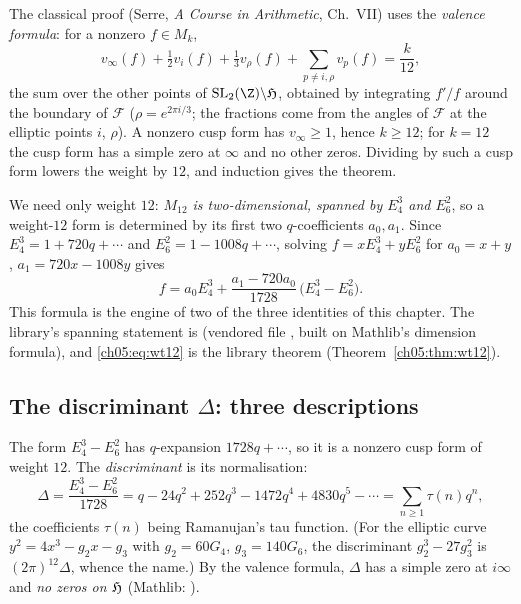The classical proof (Serre, \emph{A Course in Arithmetic}, Ch.~VII) uses the \emph{valence
formula}: for a nonzero $f\in M_k$,
\begin{equation*}
  v_\infty(f) + \tfrac12 v_i(f) + \tfrac13 v_\rho(f) + \sum_{p\neq i,\rho} v_p(f) = \frac{k}{12},
\end{equation*}
the sum over the other points of $\chfiveSL\backslash\chfiveH$, obtained by integrating $f'/f$ around
the boundary of $\mathcal F$ ($\rho = e^{2\pi i/3}$; the fractions come from the angles of $\mathcal F$
at the elliptic points $i$, $\rho$). A nonzero cusp form has $v_\infty\ge1$, hence $k\ge 12$; for
$k = 12$ the cusp form has a simple zero at $\infty$ and no other zeros. Dividing by such a cusp
form lowers the weight by $12$, and induction gives the theorem.

We need only weight $12$: \emph{$M_{12}$ is two-dimensional, spanned by $E_4^3$ and $E_6^2$}, so a
weight-$12$ form is determined by its first two $q$-coefficients $a_0,a_1$. Since $E_4^3 = 1 +
720q+\cdots$ and $E_6^2 = 1 - 1008q+\cdots$, solving $f = xE_4^3 + yE_6^2$ for $a_0 = x+y$,
$a_1 = 720x - 1008y$ gives
\begin{equation}\label{ch05:eq:wt12}
  f = a_0 E_4^3 + \frac{a_1 - 720a_0}{1728}\,\bigl(E_4^3 - E_6^2\bigr).
\end{equation}
This formula is the engine of two of the three identities of this chapter. The library's
spanning statement is  (vendored file
, built on Mathlib's dimension formula),
and \eqref{ch05:eq:wt12} is the library theorem 
(Theorem~\ref{ch05:thm:wt12}).

\subsection{The discriminant \texorpdfstring{$\Delta$}{Delta}: three descriptions}

The form $E_4^3 - E_6^2$ has $q$-expansion $1728q + \cdots$, so it is a nonzero cusp form of weight
$12$. The \emph{discriminant} is its normalisation:
\begin{equation}\label{ch05:eq:delta}
  \Delta = \frac{E_4^3 - E_6^2}{1728} = q - 24q^2 + 252q^3 - 1472q^4 + 4830 q^5 - \cdots
  = \sum_{n\ge1}\tau(n)q^n,
\end{equation}
the coefficients $\tau(n)$ being Ramanujan's tau function. (For the elliptic curve $y^2 = 4x^3 -
g_2x - g_3$ with $g_2 = 60G_4$, $g_3 = 140G_6$, the discriminant $g_2^3 - 27g_3^2$ is $(2\pi)^{12}\Delta$,
whence the name.) By the valence formula, $\Delta$ has a simple zero at $i\infty$ and \emph{no zeros on
$\mathfrak{H}$} (Mathlib: ).

